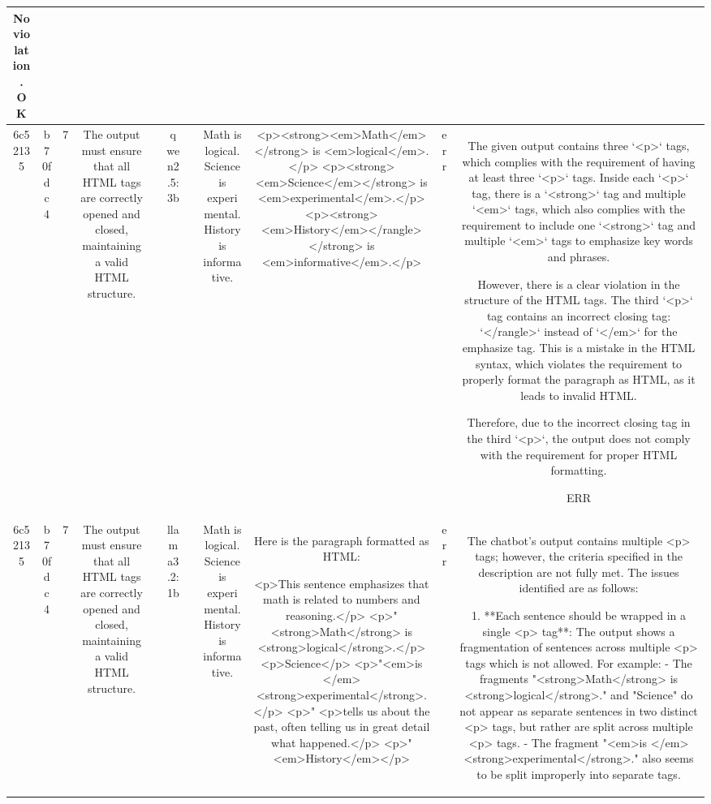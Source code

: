 \begin{table}[h!]
\begin{tabular}{|c|c|c|c|c|c|c|c|c|c|c|}
No violation.
OK\\
\hline
6c52135 & b70fdc4 & 7 & The output must ensure that all HTML tags are correctly opened and closed, maintaining a valid HTML structure. &  & qwen2.5:3b &  & Math is logical. Science is experimental. History is informative. & <p><strong><em>Math</em></strong> is <em>logical</em>.</p>
<p><strong><em>Science</em></strong> is <em>experimental</em>.</p>
<p><strong><em>History</em></rangle></strong> is <em>informative</em>.</p> & err & The given output contains three `<p>` tags, which complies with the requirement of having at least three `<p>` tags. Inside each `<p>` tag, there is a `<strong>` tag and multiple `<em>` tags, which also complies with the requirement to include one `<strong>` tag and multiple `<em>` tags to emphasize key words and phrases.

However, there is a clear violation in the structure of the HTML tags. The third `<p>` tag contains an incorrect closing tag: `</rangle>` instead of `</em>` for the emphasize tag. This is a mistake in the HTML syntax, which violates the requirement to properly format the paragraph as HTML, as it leads to invalid HTML.

Therefore, due to the incorrect closing tag in the third `<p>`, the output does not comply with the requirement for proper HTML formatting.

ERR\\
\hline
6c52135 & b70fdc4 & 7 & The output must ensure that all HTML tags are correctly opened and closed, maintaining a valid HTML structure. &  & llama3.2:1b &  & Math is logical. Science is experimental. History is informative. & Here is the paragraph formatted as HTML:

<p>This sentence emphasizes that math is related to numbers and reasoning.</p>
<p>"<strong>Math</strong> is <strong>logical</strong>.</p>
<p>Science</p>
<p>"<em>is </em><strong>experimental</strong>.</p>
<p>"
<p>tells us about the past, often telling us in great detail what happened.</p>
<p>"<em>History</em></p> & err & The chatbot's output contains multiple <p> tags; however, the criteria specified in the description are not fully met. The issues identified are as follows:

1. **Each sentence should be wrapped in a single <p> tag**: The output shows a fragmentation of sentences across multiple <p> tags which is not allowed. For example:
   - The fragments "<strong>Math</strong> is <strong>logical</strong>." and "Science" do not appear as separate sentences in two distinct <p> tags, but rather are split across multiple <p> tags.
   - The fragment "<em>is </em><strong>experimental</strong>." also seems to be split improperly into separate tags.


\end{tabular}
\end{table}
